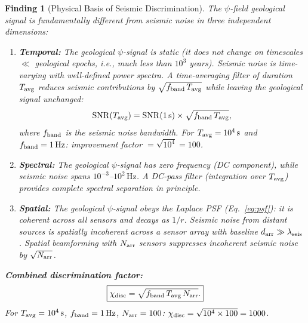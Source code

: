 \documentclass[aps,prd,twocolumn,superscriptaddress,nofootinbib]{revtex4-2}
\newtheorem{finding}{Finding}
\begin{document}
\begin{finding}[Physical Basis of Seismic Discrimination]
\label{find:seismic-disc}
The $\psi$-field geological signal is \emph{fundamentally different}
from seismic noise in three independent dimensions:

\begin{enumerate}
\item \textbf{Temporal:} The geological $\psi$-signal is \emph{static}
  (it does not change on timescales $\ll$ geological epochs, i.e.,
  much less than $10^3$ years).  Seismic noise is time-varying with
  well-defined power spectra.  A time-averaging filter of duration
  $T_{\rm avg}$ reduces seismic contributions by $\sqrt{f_{\rm band}\,T_{\rm avg}}$
  while leaving the geological signal unchanged:
  \begin{equation}
    \mathrm{SNR}(T_{\rm avg}) = \mathrm{SNR}(1\,\mathrm{s})
    \times \sqrt{f_{\rm band}\,T_{\rm avg}},
    \label{eq:snr-avg}
  \end{equation}
  where $f_{\rm band}$ is the seismic noise bandwidth.
  For $T_{\rm avg} = 10^4\,\mathrm{s}$ and $f_{\rm band} = 1\,\mathrm{Hz}$:
  improvement factor $= \sqrt{10^4} = 100$.

\item \textbf{Spectral:} The geological $\psi$-signal has zero frequency
  (DC component), while seismic noise spans $10^{-3}$--$10^2\,\mathrm{Hz}$.
  A DC-pass filter (integration over $T_{\rm avg}$) provides
  \emph{complete spectral separation} in principle.

\item \textbf{Spatial:} The geological $\psi$-signal obeys the Laplace
  PSF (Eq.~\ref{eq:psf}): it is coherent across all sensors and decays
  as $1/r$.  Seismic noise from distant sources is spatially incoherent
  across a sensor array with baseline $d_{\rm arr} \gg \lambda_{\rm seis}$.
  Spatial beamforming with $N_{\rm arr}$ sensors suppresses incoherent
  seismic noise by $\sqrt{N_{\rm arr}}$.
\end{enumerate}

\textbf{Combined discrimination factor:}
\begin{equation}
  \boxed{
  \chi_{\rm disc} = \sqrt{f_{\rm band}\,T_{\rm avg}\,N_{\rm arr}}.
  }
  \label{eq:discrimination}
\end{equation}
For $T_{\rm avg} = 10^4\,\mathrm{s}$, $f_{\rm band} = 1\,\mathrm{Hz}$,
$N_{\rm arr} = 100$: $\chi_{\rm disc} = \sqrt{10^4\times100} = 1000$.
\end{finding}
\end{document}
